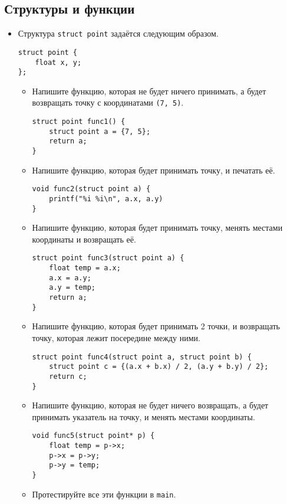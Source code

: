 \documentclass{article}
\begin{document}
\subsection*{Структуры и функции}
\begin{itemize}
\item Структура \texttt{struct point} задаётся следующим образом.
\begin{lstlisting}
struct point {
    float x, y;
};
\end{lstlisting}
\begin{itemize}
\item Напишите функцию, которая не будет ничего принимать, а будет возвращать точку с координатами \texttt{(7, 5)}.
\begin{lstlisting}[backgroundcolor = \color{solcolor}]
struct point func1() {
    struct point a = {7, 5};
    return a;
}
\end{lstlisting}
\item Напишите функцию, которая будет принимать точку, и печатать её.
\begin{lstlisting}[backgroundcolor = \color{solcolor}]
void func2(struct point a) {
    printf("%i %i\n", a.x, a.y)
}
\end{lstlisting}
\item Напишите функцию, которая будет принимать точку, менять местами координаты и возвращать её.
\begin{lstlisting}[backgroundcolor = \color{solcolor}]
struct point func3(struct point a) {
    float temp = a.x;
    a.x = a.y;
    a.y = temp;
    return a;
}
\end{lstlisting}
\item Напишите функцию, которая будет принимать 2 точки, и возвращать точку, которая лежит посередине между ними.
\begin{lstlisting}[backgroundcolor = \color{solcolor}]
struct point func4(struct point a, struct point b) {
    struct point c = {(a.x + b.x) / 2, (a.y + b.y) / 2};
    return c;
}
\end{lstlisting}
\item Напишите функцию, которая не будет ничего возвращать, а будет принимать указатель на точку, и менять местами координаты.
\begin{lstlisting}[backgroundcolor = \color{solcolor}]
void func5(struct point* p) {
    float temp = p->x;
    p->x = p->y;
    p->y = temp;
}
\end{lstlisting}
\item Протестируйте все эти функции в \texttt{main}.


\end{itemize}
\end{itemize}
\end{document}
